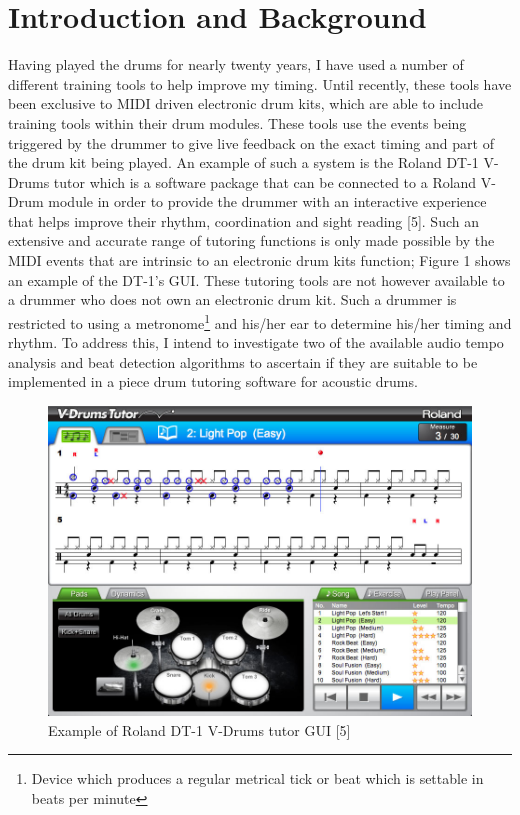 \documentclass[a4paper, 11pt]{article}
\begin{document}
\maketitle{} \section{Introduction and Background}
Having played the drums for nearly twenty years, I have used a number of different training tools to help improve my timing. Until recently, these tools have been exclusive to MIDI driven electronic drum kits, which are able to include training tools within their drum modules. These tools use the events being triggered by the drummer to give live feedback on the exact timing and part of the drum kit being played. An example of such a system is the Roland DT-1 V-Drums tutor which is a software package that can be connected to a Roland V-Drum module in order to provide the drummer with an interactive experience that helps improve their rhythm, coordination and sight reading [5]. Such an extensive and accurate range of tutoring functions is only made possible by the MIDI events that are intrinsic to an electronic drum kits function; Figure 1 shows an example of the DT-1's GUI. These tutoring tools are not however available to a drummer who does not own an electronic drum kit. Such a drummer is restricted to using a metronome\footnote{Device which produces a regular metrical tick or beat which is settable in beats per minute} and his/her ear to determine his/her timing and rhythm. To address this, I intend to investigate two of the available audio tempo analysis and beat detection algorithms to ascertain if they are suitable to be implemented in a piece drum tutoring software for acoustic drums.
\begin{figure}[h]
\caption{Example of Roland DT-1 V-Drums tutor GUI [5]}
	\centering
	\includegraphics[scale=0.25]{dt-1_ss_main_notation_gal}
\end{figure}
\end{document}
